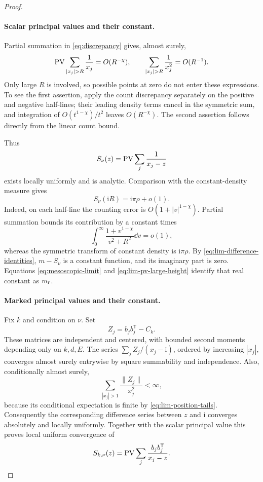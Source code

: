 \begin{proof}
\paragraph{Scalar principal values and their constant.}
Partial summation in \eqref{eq:discrepancy} gives, almost surely,
\begin{equation}\label{eq:lim-position-tails}
 \PV\sum_{|x_j|>R}\frac1{x_j}=O(R^{-\chi}),
 \qquad
 \sum_{|x_j|>R}\frac1{x_j^2}=O(R^{-1}).
\end{equation}
Only large \(R\) is involved, so possible points at zero do not
enter these expressions. To see the first assertion, apply the
count discrepancy separately on the positive and negative
half-lines; their leading density terms cancel in the symmetric
sum, and integration of \(O(t^{1-\chi})/t^2\) leaves
\(O(R^{-\chi})\). The second assertion follows directly from the
linear count bound.

Thus
\[
 S_\nu(z)=\operatorname{PV}\sum_j\frac1{x_j-z}
\]
exists locally uniformly and is analytic. Comparison with the
constant-density measure gives
\begin{equation}\label{eq:lim-pv-large-height}
 S_\nu(\mathrm i R)=\mathrm i\pi\rho+o(1).
\end{equation}
Indeed, on each half-line the counting error is
\(O(1+|v|^{1-\chi})\). Partial summation bounds its contribution
by a constant times
\[
 \int_0^\infty\frac{1+v^{1-\chi}}{v^2+R^2}\dd v=o(1),
\]
whereas the symmetric transform of constant density is
\(\mathrm i\pi\rho\).
By \eqref{eq:lim-difference-identities}, \(m-S_\nu\) is a constant
function, and its imaginary part is zero. Equations
\eqref{eq:mesoscopic-limit} and \eqref{eq:lim-pv-large-height}
identify that real constant as \(m_{\rm r}\).

\paragraph{Marked principal values and their constant.}
Fix \(k\) and condition on \(\nu\). Set
\[
 Z_j=b_jb_j^{\mathsf T}-C_k.
\]
These matrices are independent and centered, with bounded
second moments depending only on \(k,d,E\). The series
\(\sum_j Z_j/(x_j-\mathrm i)\), ordered by increasing \(|x_j|\),
converges almost surely entrywise by square summability and
independence. Also, conditionally almost surely,
\[
 \sum_{|x_j|>1}\frac{\|Z_j\|}{x_j^2}<\infty,
\]
because its conditional expectation is finite by
\eqref{eq:lim-position-tails}. Consequently the corresponding
difference series between \(z\) and \(\mathrm i\) converges
absolutely and locally uniformly. Together with the scalar
principal value this proves local uniform convergence of
\[
 S_{k,\nu}(z)=\operatorname{PV}\sum_j\frac{b_jb_j^{\mathsf T}}{x_j-z}.
\]


\end{proof}
